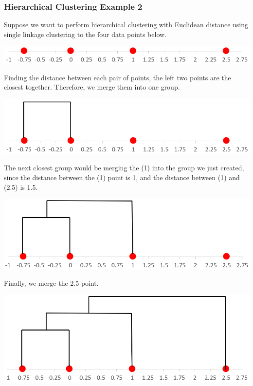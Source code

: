\documentclass[10pt]{article}
\begin{document}
\subsubsection*{Hierarchical Clustering Example 2}
Suppose we want to perform hierarchical clustering with Euclidean distance using single linkage clustering to the four data points below.
\begin{center}
    \includegraphics[width=\textwidth]{W6_10.png}
\end{center}
Finding the distance between each pair of points, the left two points are the closest together.  Therefore, we merge them into one group.
\begin{center}
    \includegraphics[width=\textwidth]{W6_11.png}
\end{center}
The next closest group would be merging the (1) into the group we just created, since the distance between the (1) point is 1, and the distance between (1) and (2.5) is 1.5.
\begin{center}
    \includegraphics[width=\textwidth]{W6_12.png}
\end{center}
Finally, we merge the 2.5 point.
\begin{center}
    \includegraphics[width=\textwidth]{W6_13.png}
\end{center}
\end{document}
